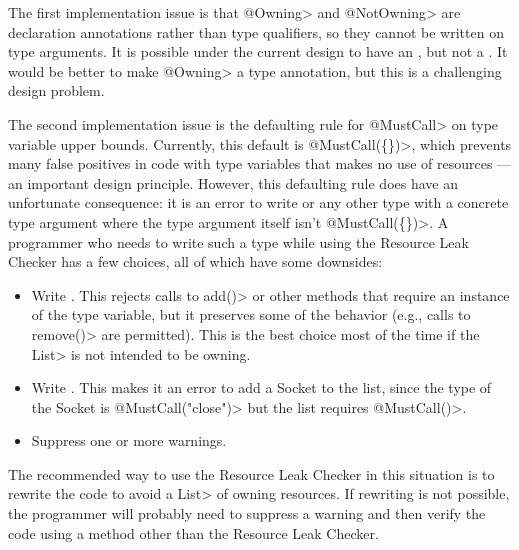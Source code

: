 The first implementation issue is that \<@Owning> and \<@NotOwning> are
declaration annotations rather than type qualifiers, so they cannot be
written on type arguments. It is possible under the current design to have
an , but not a .
It would be better to make \<@Owning> a type annotation, but this is a
challenging design problem.

The second implementation issue is the defaulting rule for \<@MustCall> on
type variable upper bounds.  Currently, this default is \<@MustCall(\{\})>,
which prevents many false positives in code with type variables that makes
no use of resources --- an important design principle.
However, this defaulting rule does have an unfortunate consequence: it is
an error to write  or any other type with a concrete
type argument where the type argument itself isn't \<@MustCall(\{\})>. A programmer who
needs to write such a type while using the Resource Leak Checker has a few
choices, all of which have some downsides:

\begin{itemize}
\item Write . This rejects calls to \<add()>
or other methods that require an instance of the type variable, but it
preserves some of the behavior (e.g., calls to \<remove()> are permitted).
This is the best choice most of the time if the \<List> is not intended to
be owning.
\item Write . This makes it an error to
add a Socket to the list, since the type of the Socket is
\<@MustCall("close")> but the list requires \<@MustCall()>.
\item Suppress one or more warnings.
\end{itemize}

The recommended way to use the Resource Leak Checker in this situation is
to rewrite the code to avoid a \<List> of owning resources. If rewriting is
not possible, the programmer will probably need to suppress a warning and
then verify the code using a method other than the Resource Leak Checker.

